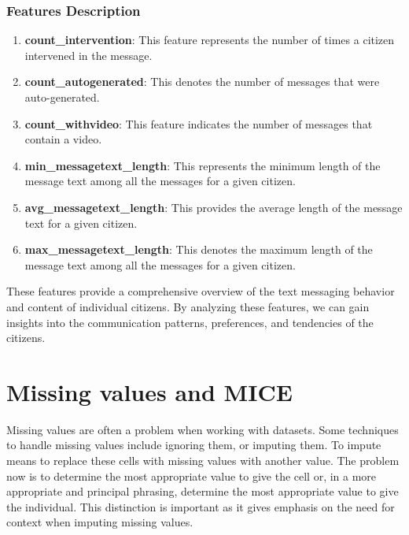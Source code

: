 \documentclass[12pt]{article}
\begin{document}
\subsubsection{Features Description}

\begin{enumerate}
    \item \textbf{count\_intervention}: This feature represents the number of times a citizen intervened in the message.
    
    \item \textbf{count\_autogenerated}: This denotes the number of messages that were auto-generated.
    
    \item \textbf{count\_withvideo}: This feature indicates the number of messages that contain a video.
    
    \item \textbf{min\_messagetext\_length}: This represents the minimum length of the message text among all the messages for a given citizen.
    
    \item \textbf{avg\_messagetext\_length}: This provides the average length of the message text for a given citizen.
    
    \item \textbf{max\_messagetext\_length}: This denotes the maximum length of the message text among all the messages for a given citizen.
\end{enumerate}

These features provide a comprehensive overview of the text messaging behavior and content of individual citizens. By analyzing these features, we can gain insights into the communication patterns, preferences, and tendencies of the citizens.

\section{Missing values and MICE}
	
	Missing values are often a problem when working with datasets. Some techniques to handle missing values include ignoring them, or imputing them. To impute means to replace these cells with missing values with another value. The problem now is to determine the most appropriate value to give the cell or, in a more appropriate and principal phrasing, determine the most appropriate value to give the individual. This distinction is important as it gives emphasis on the need for context when imputing missing values.
	
\end{document}
